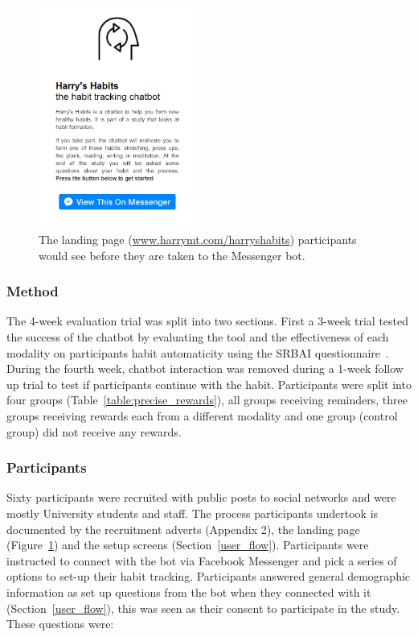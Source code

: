 \begin{figure}[H]
  \centering
  \includegraphics[width=2in]{resources/design/process/harryshabits-landing-page.png}
  \caption{The landing page (\url{www.harrymt.com/harryshabits}) participants would see before they are taken to the Messenger bot.}
  \label{fig:landing_page}
\end{figure}

\subsubsection{Method}
The 4-week evaluation trial was split into two sections. First a 3-week trial tested the success of the chatbot by evaluating the tool and the effectiveness of each modality on participants habit automaticity using the SRBAI questionnaire~\cite{article_4q_SRBAI}. During the fourth week, chatbot interaction was removed during a 1-week follow up trial to test if participants continue with the habit. Participants were split into four groups (Table~\ref{table:precise_rewards}), all groups receiving reminders, three groups receiving rewards each from a different modality and one group (control group) did not receive any rewards.


\subsubsection{Participants}
Sixty participants were recruited with public posts to social networks and were mostly University students and staff. The process participants undertook is documented by the recruitment adverts (Appendix 2), the landing page (Figure~\ref{fig:landing_page}) and the setup screens (Section~\ref{user_flow}). Participants were instructed to connect with the bot via Facebook Messenger and pick a series of options to set-up their habit tracking. Participants answered general demographic information as set up questions from the bot when they connected with it (Section~\ref{user_flow}), this was seen as their consent to participate in the study. These questions were:


